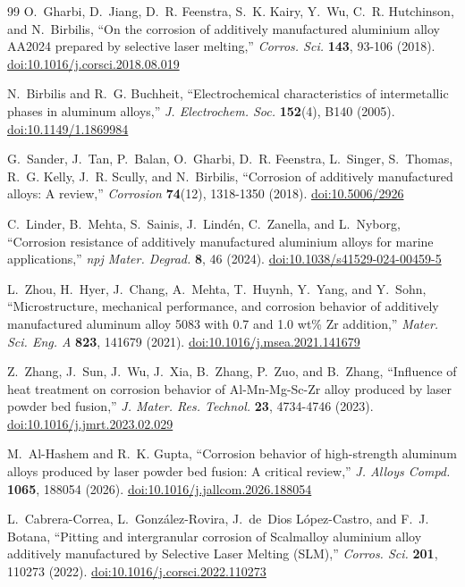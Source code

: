 \documentclass[12pt,letterpaper]{article}
\begin{document}
\begin{thebibliography}{99}
O.~Gharbi, D.~Jiang, D.~R. Feenstra, S.~K. Kairy, Y.~Wu, C.~R. Hutchinson,
and N.~Birbilis, ``On the corrosion of additively manufactured aluminium alloy
AA2024 prepared by selective laser melting,'' \emph{Corros. Sci.}
\textbf{143}, 93-106 (2018).
\href{https://doi.org/10.1016/j.corsci.2018.08.019}{doi:10.1016/j.corsci.2018.08.019}

N.~Birbilis and R.~G. Buchheit, ``Electrochemical characteristics of
intermetallic phases in aluminum alloys,'' \emph{J. Electrochem. Soc.}
\textbf{152}(4), B140 (2005).
\href{https://doi.org/10.1149/1.1869984}{doi:10.1149/1.1869984}

G.~Sander, J.~Tan, P.~Balan, O.~Gharbi, D.~R. Feenstra, L.~Singer,
S.~Thomas, R.~G. Kelly, J.~R. Scully, and N.~Birbilis, ``Corrosion of
additively manufactured alloys: A review,'' \emph{Corrosion} \textbf{74}(12),
1318-1350 (2018).
\href{https://doi.org/10.5006/2926}{doi:10.5006/2926}

C.~Linder, B.~Mehta, S.~Sainis, J.~Lind{\'e}n, C.~Zanella, and L.~Nyborg,
``Corrosion resistance of additively manufactured aluminium alloys for marine
applications,'' \emph{npj Mater. Degrad.} \textbf{8}, 46 (2024).
\href{https://doi.org/10.1038/s41529-024-00459-5}{doi:10.1038/s41529-024-00459-5}

L.~Zhou, H.~Hyer, J.~Chang, A.~Mehta, T.~Huynh, Y.~Yang, and Y.~Sohn,
``Microstructure, mechanical performance, and corrosion behavior of
additively manufactured aluminum alloy 5083 with 0.7 and 1.0 wt\% Zr
addition,'' \emph{Mater. Sci. Eng. A} \textbf{823}, 141679 (2021).
\href{https://doi.org/10.1016/j.msea.2021.141679}{doi:10.1016/j.msea.2021.141679}

Z.~Zhang, J.~Sun, J.~Wu, J.~Xia, B.~Zhang, P.~Zuo, and B.~Zhang, ``Influence
of heat treatment on corrosion behavior of Al-Mn-Mg-Sc-Zr alloy produced by
laser powder bed fusion,'' \emph{J. Mater. Res. Technol.} \textbf{23},
4734-4746 (2023).
\href{https://doi.org/10.1016/j.jmrt.2023.02.029}{doi:10.1016/j.jmrt.2023.02.029}

M.~Al-Hashem and R.~K. Gupta, ``Corrosion behavior of high-strength aluminum
alloys produced by laser powder bed fusion: A critical review,'' \emph{J.
Alloys Compd.} \textbf{1065}, 188054 (2026).
\href{https://doi.org/10.1016/j.jallcom.2026.188054}{doi:10.1016/j.jallcom.2026.188054}

L.~Cabrera-Correa, L.~Gonz{\'a}lez-Rovira, J.~de~Dios L{\'o}pez-Castro, and
F.~J. Botana, ``Pitting and intergranular corrosion of Scalmalloy aluminium
alloy additively manufactured by Selective Laser Melting (SLM),''
\emph{Corros. Sci.} \textbf{201}, 110273 (2022).
\href{https://doi.org/10.1016/j.corsci.2022.110273}{doi:10.1016/j.corsci.2022.110273}


\end{thebibliography}
\end{document}

